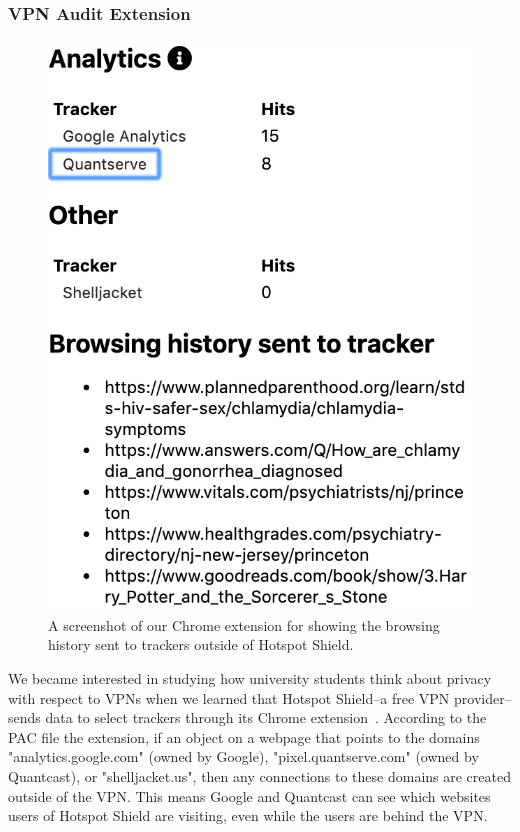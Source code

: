 \subsubsection{VPN Audit Extension}
\begin{figure}[t]
    \includegraphics[width=0.85\linewidth]{sections/figures/vpn-audit.png}
    \caption{A screenshot of our Chrome extension for showing the browsing history sent to trackers outside of Hotspot Shield.}
    \label{fig:vpn-audit}
\end{figure}

We became interested in studying how university students think about privacy with respect to VPNs  when we learned that Hotspot Shield--a free VPN provider--sends data to select trackers through its Chrome extension~\cite{windscribe-hotspot-shield}.
According to the PAC file the extension, if an object on a webpage that points to the domains "analytics.google.com" (owned by Google), "pixel.quantserve.com" (owned by Quantcast), or "shelljacket.us", then any connections to these domains are created outside of the VPN.
This means Google and Quantcast can see which websites users of Hotspot Shield are visiting, even while the users are behind the VPN.


